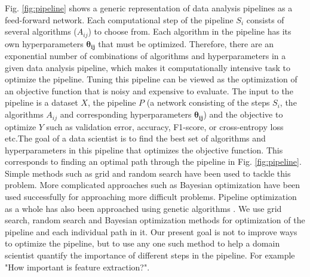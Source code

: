 Fig. \ref{fig:pipeline} shows a generic representation of data analysis pipelines as a feed-forward network. Each computational step of the pipeline $S_{i}$ consists of several algorithms ($A_{ij}$) to choose from. Each algorithm in the pipeline has its own hyperparameters $\bm{\theta_{ij}}$ that must be optimized. Therefore, there are an exponential number of combinations of algorithms and hyperparameters in a given data analysis pipeline, which makes it computationally intensive task to optimize the pipeline. Tuning this pipeline can be viewed as the optimization of an objective function that is noisy and expensive to evaluate. The input to the pipeline is a dataset $X$, the pipeline $P$ (a network consisting of the steps $S_{i}$, the algorithms $A_{ij}$ and corresponding hyperparameters $\bm{\theta_{ij}}$) and the objective to optimize $Y$ such as validation error, accuracy, F1-score, or cross-entropy loss etc.The goal of a data scientist is to find the best set of algorithms and hyperparameters in this pipeline that optimizes the objective function. This corresponds to finding an optimal path through the pipeline in Fig. \ref{fig:pipeline}.  Simple methods such as grid and random search \cite{bergstra2012random} have been used to tackle this problem. More complicated approaches such as Bayesian optimization \cite{snoek2012practical, zhang2016flash} have been used successfully for approaching more difficult problems. Pipeline optimization as a whole has also been approached using genetic algorithms \cite{olson2016evaluation, olson2016tpot}.
We use grid search, random search and Bayesian optimization methods for optimization of the pipeline and each individual path in it. Our present goal is not to improve ways to optimize the pipeline, but to use any one such method to help a domain scientist quantify the importance of different steps in the pipeline. For example "How important is feature extraction?".

